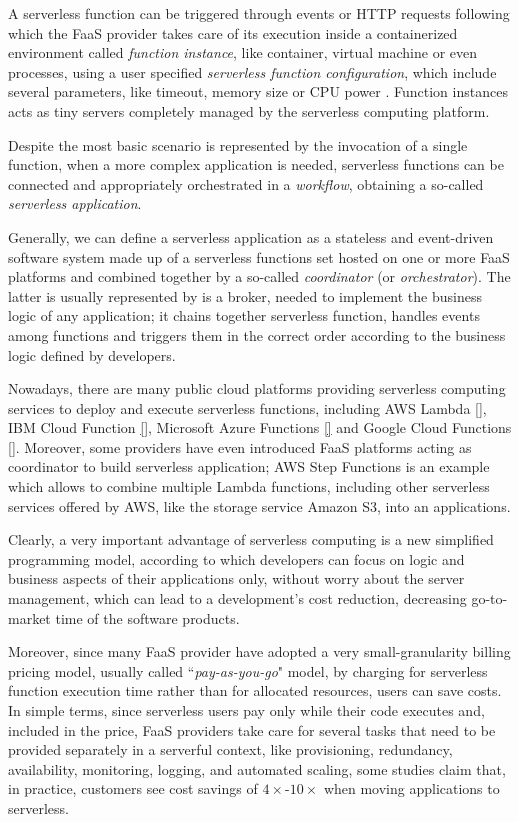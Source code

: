 \documentclass[12pt,a4paper]{report}
\newcommand{\ItalicQuotMark}[1]{``\textit{#1}"}
\begin{document}
A serverless function can be triggered through events or HTTP requests following which the FaaS provider takes care of its execution inside a containerized environment called \textit{function instance}, like container, virtual machine or even processes, using a user specified \textit{serverless function configuration}, which include several parameters, like timeout, memory size or CPU power \cite{COSE}. Function instances acts as tiny servers completely managed by the serverless computing platform. 

Despite the most basic scenario is represented by the invocation of a single function, when a more complex application is needed, serverless functions can be connected and appropriately orchestrated in a \textit{workflow}, obtaining a so-called \textit{serverless application}.

Generally, we can define a serverless application as a stateless and event-driven software system made up of a serverless functions set hosted on one or more FaaS platforms and combined together by a so-called \textit{coordinator} (or \textit{orchestrator}). The latter is usually represented by is a broker, needed to implement the business logic of any application; it chains together serverless function, handles events among functions and triggers them in the correct order according to the business logic defined by developers. 

Nowadays, there are many public cloud platforms providing serverless computing services to deploy and execute serverless functions, including AWS Lambda \ref{}, IBM Cloud Function \ref{}, Microsoft Azure Functions \ref{} and Google Cloud Functions \ref{}. Moreover, some providers have even introduced FaaS platforms acting as coordinator to build serverless application; AWS Step Functions is an example which allows to combine multiple Lambda functions, including other serverless services offered by AWS, like the storage service Amazon S3, into an applications.  

Clearly, a very important advantage of serverless computing is a new simplified programming model, according to which developers can focus on logic and business aspects of their applications only, without worry about the server management, which can lead to a development's cost reduction, decreasing go-to-market time of the software products.

Moreover, since many FaaS provider have adopted a very small-granularity billing pricing model, usually called \ItalicQuotMark{pay-as-you-go} model, by charging for serverless function execution time rather than for allocated resources, users can save costs. In simple terms, since serverless users pay only while their code executes and, included in the price, FaaS providers take care for several tasks that need to be provided separately in a serverful context, like  provisioning, redundancy, availability, monitoring, logging, and automated scaling, some studies claim that, in practice, customers see cost savings of $4\times$-$10\times$ when moving applications to serverless.
\end{document}
